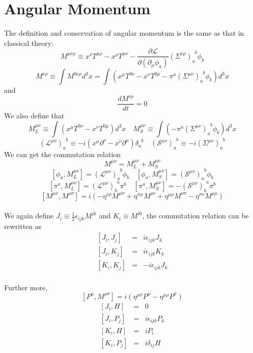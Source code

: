 \section{Angular Momentum}
\noindent
The definition and conservation of angular momentum is the same as that in classical theory:
\[M^{\mu \nu \rho} \equiv x^{\nu}T^{\mu \rho} - x^{\rho} T^{\mu \nu} - \frac{\partial \mathcal{L}}{\partial (\partial_{\mu}\phi_a)}(\Sigma^{\nu \rho})_{a}^{\phantom{a}b}\phi_b\]
\[M^{\nu \rho} \equiv \int M^{0 \nu \rho} d^3 x = \int (x^{\mu}T^{0\nu}-x^{\nu}T^{0\mu}-\pi^a(\Sigma^{\mu \nu})_{a}^{\phantom{a}b}\phi_b) d^3 x\]
and
\[\frac{dM^{\nu \rho}}{dt} = 0\]
We also define that
\[M_{L}^{\mu \nu} \equiv \int (x^{\mu}T^{0\nu}-x^{\nu}T^{0\mu}) d^3 x \quad M_S^{\mu \nu} \equiv\int (-\pi^a(\Sigma^{\mu \nu})_{a}^{\phantom{a}b}\phi_b) d^3 x\]
\[(\mathcal{L}^{\mu \nu})_a^{\phantom{a}b} \equiv -i(x^{\mu}\partial^{\nu}-x^{\nu}\partial^{\mu})\delta_a^{\phantom{a}b} \quad (\mathcal{S}^{\mu \nu})_a^{\phantom{a}b} \equiv -i(\Sigma^{\mu \nu})_a^{\phantom{a}b}\]
We can get the commutation relation
\[M^{\mu \nu} = M_L^{\mu \nu} + M_S^{\mu \nu}\]
\[[\phi_a,M_L^{\mu \nu}] = (\mathcal{L}^{\mu \nu})_a^{\phantom{a}b} \phi_b \quad [\phi_a,M_S^{\mu \nu}] = (\mathcal{S}^{\mu \nu})_a^{\phantom{a}b} \phi_b\]
\[[\pi^a,M_L^{\mu \nu}] = (\mathcal{L}^{\mu \nu})_b^{\phantom{b}a}\pi^{b}  \quad [\pi^a,M_S^{\mu \nu}] = - (\mathcal{S}^{\mu \nu})_b^{\phantom{b}a} \pi^b \]
\[[M^{\mu \nu},M^{\rho \sigma}] = i(-\eta^{\nu \rho}M^{\mu \sigma} + \eta^{\sigma \mu}M^{\rho \nu} + \eta^{\mu \rho}M^{\nu \sigma} - \eta^{\sigma \nu}M^{\rho \mu})\] \\
We again define $J_i \equiv \frac{1}{2} \epsilon_{ijk} M^{jk}$ and $K_i \equiv M^{i0}$, the commutation relation can be rewritten as
\begin{eqnarray}
\left[J_i,J_j\right] &=& i\epsilon_{ijk}J_k \nonumber \\
\left[J_i,K_j\right] &=& i\epsilon_{ijk}K_k \nonumber \\
\left[K_i,K_j\right] &=& -i\epsilon_{ijk}J_k \nonumber
\end{eqnarray} \\
Further more,
\[[P^{\mu},M^{\rho \sigma}] = i(\eta^{\mu \sigma}P^{\mu} - \eta^{\mu \rho}P^{\sigma})\]
\begin{eqnarray}
\left[J_i,H\right] &=& 0 \nonumber \\
\left[J_i,P_j\right] &=& i\epsilon_{ijk}P_k \nonumber \\
\left[K_i,H\right] &=& iP_i \nonumber \\
\left[K_i,P_j\right] &=& i\delta_{ij}H \nonumber
\end{eqnarray}
